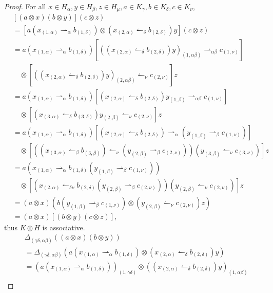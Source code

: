 \documentclass[11pt]{article}
\def\a{\alpha}
\def\b{\beta}
\def\d{\delta}
\def\g{\gamma}
\def\o{\otimes}
\begin{document}
\begin{proof}
For all $x\in H_\a,y\in H_\b,z\in H_\mu,a\in K_\g,b\in K_\d,c\in K_\nu$,
\begin{align*}
&[(a\o x)(b\o y)](c\o z)\\
&=[a(x_{(1,\a)}\rightharpoonup_\a b_{(1,\d)})\o(x_{(2,\a)}\leftharpoonup_\d b_{(2,\d)})y](c\o z)\\
&=a(x_{(1,\a)}\rightharpoonup_\a b_{(1,\d)})[((x_{(2,\a)}\leftharpoonup_\d b_{(2,\d)})y)_{(1,\a\b)}\rightharpoonup_{\a\b}c_{(1,\nu)}]\\
&\quad\o[((x_{(2,\a)}\leftharpoonup_\d b_{(2,\d)})y)_{(2,\a\b)}\leftharpoonup_{\nu}c_{(2,\nu)}]z\\
&=a(x_{(1,\a)}\rightharpoonup_\a b_{(1,\d)})[(x_{(2,\a)}\leftharpoonup_\d b_{(2,\d)})y_{(1,\b)}\rightharpoonup_{\a\b}c_{(1,\nu)}]\\
&\quad\o[(x_{(3,\a)}\leftharpoonup_\d b_{(3,\d)})y_{(2,\b)}\leftharpoonup_{\nu}c_{(2,\nu)}]z\\
&=a(x_{(1,\a)}\rightharpoonup_\a b_{(1,\d)})[(x_{(2,\a)}\leftharpoonup_\d b_{(2,\d)})\rightharpoonup_{\a}(y_{(1,\b)}\rightharpoonup_{\b}c_{(1,\nu)})]\\
&\quad\o[((x_{(3,\a)}\leftharpoonup_\b b_{(3,\b)})\leftharpoonup_\nu (y_{(2,\b)}\rightharpoonup_{\b}c_{(2,\nu)}))(y_{(3,\b)}\leftharpoonup_{\nu}c_{(3,\nu)})]z\\
&=a(x_{(1,\a)}\rightharpoonup_{\a} b_{(1,\d)}(y_{(1,\b)}\rightharpoonup_{\b}c_{(1,\nu)}))\\
&\quad\o[(x_{(2,\a)}\leftharpoonup_{\d\nu} b_{(2,\d)} (y_{(2,\b)}\rightharpoonup_{\b}c_{(2,\nu)}))(y_{(2,\b)}\leftharpoonup_{\nu}c_{(2,\nu)})]z\\
&=(a\o x)(b(y_{(1,\b)}\rightharpoonup_\b c_{(1,\nu)})\o(y_{(2,\b)}\leftharpoonup_\nu c_{(2,\nu)})z)\\
&=(a\o x)[(b\o y)(c\o z)],
\end{align*}
thus $K\o H$ is associative. 
\begin{align*}
&\Delta_{(\g\d,\a\b)}((a\o x)(b\o y))\\
&=\Delta_{(\g\d,\a\b)}(a(x_{(1,\a)}\rightharpoonup_\a b_{(1,\d)})\o(x_{(2,\a)}\leftharpoonup_\d b_{(2,\d)})y)\\
&=(a(x_{(1,\a)}\rightharpoonup_\a b_{(1,\d)}))_{(1,\g\d)}\o((x_{(2,\a)}\leftharpoonup_\d b_{(2,\d)})y)_{(1,\a\b)}\\

\end{align*}
\end{proof}
\end{document}
